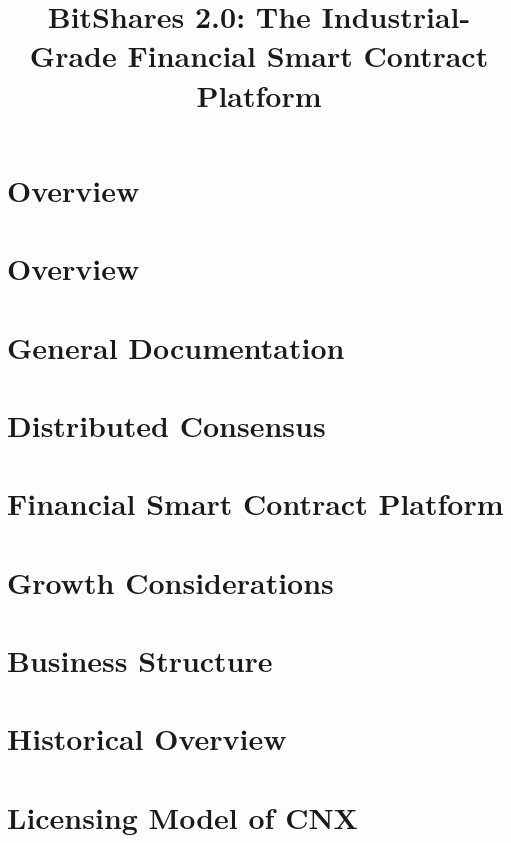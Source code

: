 \documentclass[conference,final,10pt,a4paper]{IEEEtran}
\title{BitShares 2.0: The Industrial-Grade Financial Smart Contract Platform}
\author{}
\begin{document}
\sloppy
\maketitle

\begin{abstract}
\end{abstract}

\section{Overview}
\section    { Overview }
\section    { General Documentation }               %
\section    { Distributed Consensus }               %
\section    { Financial Smart Contract Platform }   %
\section    { Growth Considerations }               %
\section    { Business Structure }                  %
\section    { Historical Overview }                 %
\section    { Licensing Model of CNX }              %
\end{document}
